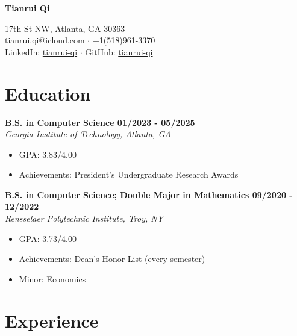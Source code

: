 \documentclass[letterpaper, 11pt]{article}
\newcommand{\subsectionvspace}{\vspace{8pt}}
\begin{document}
\begin{minipage}[t]{0.3\textwidth}
    \vspace*{0\baselineskip}\textbf{\huge Tianrui Qi}
\end{minipage}%
\begin{minipage}[t]{0.7\textwidth}
     17th St NW, Atlanta, GA 30363
    \\
    tianrui.qi@icloud.com 
    $\cdot$ 
    +1(518)961-3370
    \\
    LinkedIn: \href{https://www.linkedin.com/in/tianrui-qi/}{tianrui-qi}
    $\cdot$
    GitHub: \href{https://github.com/tianrui-qi}{tianrui-qi}
\end{minipage}


\section{Education}


    \textbf{B.S. in Computer Science \hfill 01/2023 - 05/2025} \\
    \textit{Georgia Institute of Technology, Atlanta, GA}
    \begin{itemize}
        \item GPA: 3.83/4.00
        \item Achievements: President's Undergraduate Research Awards
    \end{itemize}

    \subsectionvspace

    \textbf{B.S. in Computer Science; Double Major in Mathematics \hfill 09/2020 - 12/2022} \\
    \textit{Rensselaer Polytechnic Institute, Troy, NY}
    \begin{itemize}
        \item GPA: 3.73/4.00
        \item Achievements: Dean's Honor List (every semester)
        \item Minor: Economics
    \end{itemize}


\section{Experience}
\end{document}
